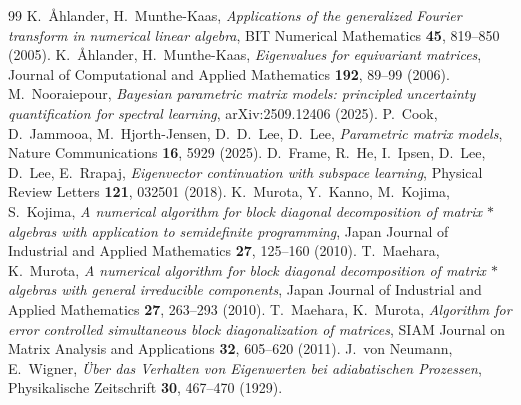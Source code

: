 \documentclass[10pt,a4paper]{amsart}
\begin{document}
\begin{thebibliography}{99}
 K.~\AA hlander, H.~Munthe-Kaas, \emph{Applications of the generalized Fourier transform in numerical linear algebra}, BIT Numerical Mathematics \textbf{45}, 819--850 (2005).
 K.~\AA hlander, H.~Munthe-Kaas, \emph{Eigenvalues for equivariant matrices}, Journal of Computational and Applied Mathematics \textbf{192}, 89--99 (2006).
 M.~Nooraiepour, \emph{Bayesian parametric matrix models: principled uncertainty quantification for spectral learning}, arXiv:2509.12406 (2025).
 P.~Cook, D.~Jammooa, M.~Hjorth-Jensen, D.~D.~Lee, D.~Lee, \emph{Parametric matrix models}, Nature Communications \textbf{16}, 5929 (2025).
 D.~Frame, R.~He, I.~Ipsen, D.~Lee, D.~Lee, E.~Rrapaj, \emph{Eigenvector continuation with subspace learning}, Physical Review Letters \textbf{121}, 032501 (2018).
 K.~Murota, Y.~Kanno, M.~Kojima, S.~Kojima, \emph{A numerical algorithm for block diagonal decomposition of matrix $*$ algebras with application to semidefinite programming}, Japan Journal of Industrial and Applied Mathematics \textbf{27}, 125--160 (2010).
 T.~Maehara, K.~Murota, \emph{A numerical algorithm for block diagonal decomposition of matrix $*$ algebras with general irreducible components}, Japan Journal of Industrial and Applied Mathematics \textbf{27}, 263--293 (2010).
 T.~Maehara, K.~Murota, \emph{Algorithm for error controlled simultaneous block diagonalization of matrices}, SIAM Journal on Matrix Analysis and Applications \textbf{32}, 605--620 (2011).
 J.~von Neumann, E.~Wigner, \emph{\"Uber das Verhalten von Eigenwerten bei adiabatischen Prozessen}, Physikalische Zeitschrift \textbf{30}, 467--470 (1929).
\end{thebibliography}
\end{document}

